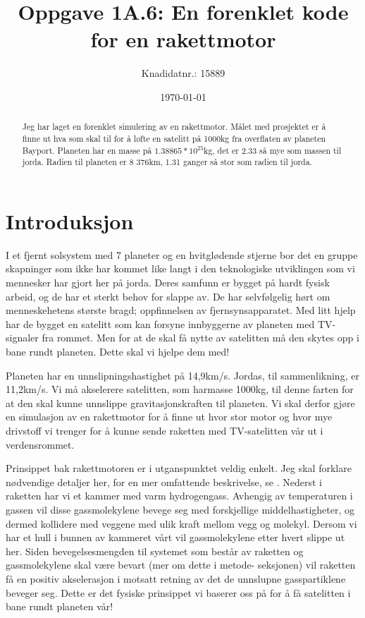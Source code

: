 \documentclass[reprint,english,notitlepage]{revtex4-1}  %
\begin{document}
\title{Oppgave 1A.6: En forenklet kode for en rakettmotor}
\date{\today}
\author{Knadidatnr.: 15889}


\newpage

\begin{abstract}
Jeg har laget en forenklet simulering av en rakettmotor. Målet med prosjektet er å finne
 ut hva som skal til for å løfte en satelitt på 1000kg fra overflaten av planeten Bayport.
 Planeten har en masse på $1.38865*10^{25}$kg, det er 2.33 så mye som massen til jorda.
 Radien til planeten er 8 376km, 1.31 ganger så stor som radien til jorda.
\end{abstract}
\maketitle                                %



\section{Introduksjon}
\label{sect:intro}

I et fjernt solsystem med 7 planeter og en hvitglødende stjerne bor det en gruppe
 skapninger som ikke har kommet like langt i den teknologiske utviklingen som vi mennesker
 har gjort her på jorda. Deres samfunn er bygget på hardt fysisk arbeid, og de har et
 sterkt behov for slappe av. De har selvfølgelig hørt om menneskehetens største bragd;
 oppfinnelsen av fjernsynsapparatet. Med litt hjelp har de bygget en satelitt som kan
 forsyne innbyggerne av planeten med TV-signaler fra rommet. Men for at de skal få nytte
 av satelitten må den skytes opp i bane rundt planeten. Dette skal vi hjelpe dem med!

Planeten har en unnslipningshastighet på 14,9km/s. Jordas, til sammenlikning, er 11,2km/s.
 Vi må akselerere satelitten, som harmasse 1000kg, til denne farten for at den skal kunne
 unnslippe gravitasjonskraften til planeten. Vi skal derfor gjøre en simulasjon av en
 rakettmotor for å finne ut hvor stor motor og hvor mye drivstoff vi trenger for å kunne
 sende raketten med TV-satelitten vår ut i verdensrommet.

Prinsippet bak rakettmotoren er i utganspunktet veldig enkelt. Jeg skal forklare
 nødvendige detaljer her, for en mer omfattende beskrivelse, se \citep{part1A}. Nederst i
 raketten har vi et kammer med varm hydrogengass. Avhengig av temperaturen i gassen vil
 disse gassmolekylene bevege seg med forskjellige middelhastigheter, og dermed kollidere
 med veggene med ulik kraft mellom vegg og molekyl. Dersom vi har et hull i bunnen av
 kammeret vårt vil gassmolekylene etter hvert slippe ut her. Siden bevegelsesmengden til
 systemet som består av raketten og gassmolekylene skal være bevart (mer om dette i metode-
 seksjonen) vil raketten få en positiv akselerasjon i motsatt retning av det de unnslupne
 gasspartiklene beveger seg. Dette er det fysiske prinsippet vi baserer oss på for å få
 satelitten i bane rundt planeten vår!
\end{document}
